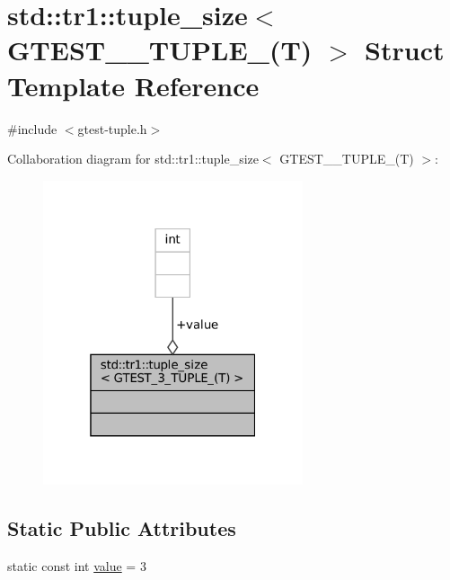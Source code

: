 \hypertarget{structstd_1_1tr1_1_1tuple__size_3_01GTEST__3__TUPLE___07T_08_01_4}{}\section{std\+:\+:tr1\+:\+:tuple\+\_\+size$<$ G\+T\+E\+S\+T\+\_\+\_\+\+T\+U\+P\+L\+E\+\_\+(T) $>$ Struct Template Reference}
\label{structstd_1_1tr1_1_1tuple__size_3_01GTEST__3__TUPLE___07T_08_01_4}


{\ttfamily \#include $<$gtest-\/tuple.\+h$>$}



Collaboration diagram for std\+:\+:tr1\+:\+:tuple\+\_\+size$<$ G\+T\+E\+S\+T\+\_\+\_\+\+T\+U\+P\+L\+E\+\_\+(T) $>$\+:
\nopagebreak
\begin{figure}[H]
\begin{center}
\leavevmode
\includegraphics[width=217pt]{structstd_1_1tr1_1_1tuple__size_3_01GTEST__3__TUPLE___07T_08_01_4__coll__graph}
\end{center}
\end{figure}
\subsection*{Static Public Attributes}
\begin{DoxyCompactItemize}
\item 
static const int \hyperlink{structstd_1_1tr1_1_1tuple__size_3_01GTEST__3__TUPLE___07T_08_01_4_ac1e2e7bb87bad1d33e4373b3e1af37c3}{value} = 3
\end{DoxyCompactItemize}


